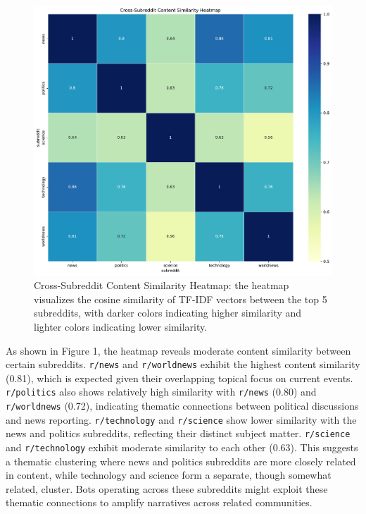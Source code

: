 \documentclass[
  12pt,
  letterpaper,
  DIV=11,
  numbers=noendperiod]{scrartcl}
\begin{document}
\begin{figure}[H]

{\centering \includegraphics[width=1\linewidth,height=\textheight,keepaspectratio]{detecting_bots_on_reddit_code_files/figure-pdf/cell-28-output-1.pdf}

}

\caption{Cross-Subreddit Content Similarity Heatmap: the heatmap
visualizes the cosine similarity of TF-IDF vectors between the top 5
subreddits, with darker colors indicating higher similarity and lighter
colors indicating lower similarity.}

\end{figure}%

As shown in Figure 1, the heatmap reveals moderate content similarity
between certain subreddits. \texttt{r/news} and \texttt{r/worldnews}
exhibit the highest content similarity (0.81), which is expected given
their overlapping topical focus on current events. \texttt{r/politics}
also shows relatively high similarity with \texttt{r/news} (0.80) and
\texttt{r/worldnews} (0.72), indicating thematic connections between
political discussions and news reporting. \texttt{r/technology} and
\texttt{r/science} show lower similarity with the news and politics
subreddits, reflecting their distinct subject matter. \texttt{r/science}
and \texttt{r/technology} exhibit moderate similarity to each other
(0.63). This suggests a thematic clustering where news and politics
subreddits are more closely related in content, while technology and
science form a separate, though somewhat related, cluster. Bots
operating across these subreddits might exploit these thematic
connections to amplify narratives across related communities.
\end{document}
